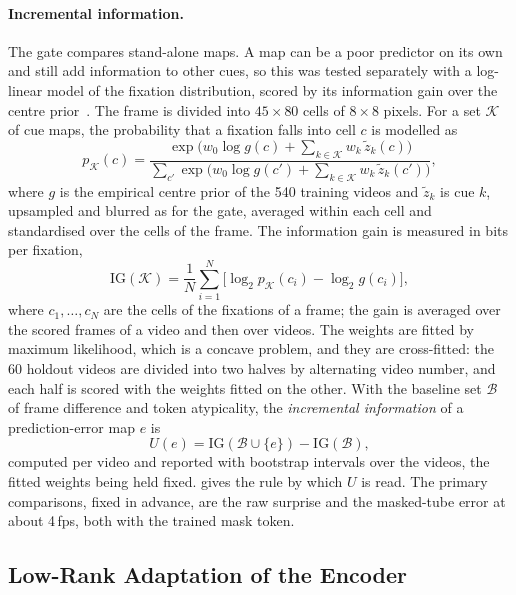 \paragraph{Incremental information.} The gate compares stand-alone maps. A
map can be a poor predictor on its own and still add information to other
cues, so this was tested separately with a log-linear model of the fixation
distribution, scored by its information gain over the centre
prior~\cite{kummerer2015information}. The frame is divided into $45\times80$
cells of $8\times8$ pixels. For a set $\mathcal{K}$ of cue maps, the
probability that a fixation falls into cell $c$ is modelled as
\begin{equation}
  p_{\mathcal{K}}(c) = \frac{\exp\big(w_0\log g(c)+\sum_{k\in\mathcal{K}}w_k\,\tilde z_k(c)\big)}
  {\sum_{c'}\exp\big(w_0\log g(c')+\sum_{k\in\mathcal{K}}w_k\,\tilde z_k(c')\big)},
  \label{eq:loglinear}
\end{equation}
where $g$ is the empirical centre prior of the 540 training videos and
$\tilde z_k$ is cue $k$, upsampled and blurred as for the gate, averaged
within each cell and standardised over the cells of the frame. The
information gain is measured in bits per fixation,
\begin{equation}
  \mathrm{IG}(\mathcal{K}) = \frac{1}{N}\sum_{i=1}^{N}
  \big[\log_2 p_{\mathcal{K}}(c_i)-\log_2 g(c_i)\big],
  \label{eq:ig}
\end{equation}
where $c_1,\dots,c_N$ are the cells of the fixations of a frame; the gain is
averaged over the scored frames of a video and then over videos. The weights
are fitted by maximum likelihood, which is a concave problem, and they are
cross-fitted: the 60 holdout videos are divided into two halves by
alternating video number, and each half is scored with the weights fitted on
the other. With the baseline set $\mathcal{B}$ of frame difference and token
atypicality, the \emph{incremental information} of a prediction-error map $e$
is
\begin{equation}
  U(e) = \mathrm{IG}(\mathcal{B}\cup\{e\})-\mathrm{IG}(\mathcal{B}),
  \label{eq:incremental}
\end{equation}
computed per video and reported with bootstrap intervals over the videos, the
fitted weights being held fixed.  gives the rule by which $U$
is read. The primary comparisons, fixed in advance, are the raw surprise and
the masked-tube error at about 4\,fps, both with the trained mask token.

\subsection{Low-Rank Adaptation of the Encoder}\label{sec:lora}

